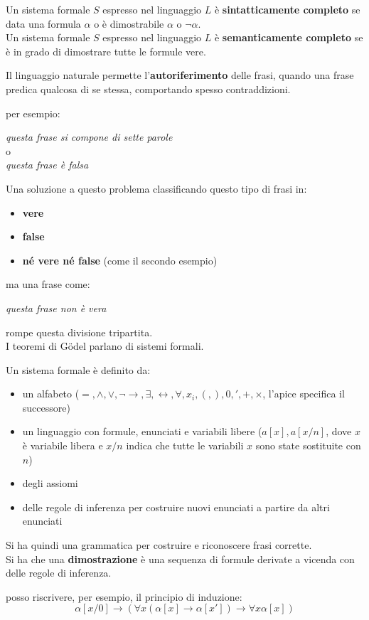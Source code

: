 \documentclass[a4paper,12pt, oneside]{book}
\begin{document}
\begin{definizione}
  Un sistema formale $S$ espresso nel linguaggio $L$ è \textbf{sintatticamente
    completo} se data una formula $\alpha$ o è dimostrabile $\alpha$ o
  $\neg\alpha$.\\
  Un sistema formale $S$ espresso nel linguaggio $L$ è \textbf{semanticamente
    completo} se è in grado di dimostrare tutte le formule vere.
\end{definizione}
Il linguaggio naturale permette l'\textbf{autoriferimento} delle frasi, quando
una frase predica qualcosa di se stessa, comportando spesso contraddizioni.
\begin{esempio}
  per esempio:
  \begin{center}
    \textit{questa frase si compone di sette parole}
    \\o\\
    \textit{questa frase è falsa}
  \end{center}
\end{esempio}
Una soluzione a questo problema classificando questo tipo di frasi in:
\begin{itemize}
  \item \textbf{vere}
  \item \textbf{false}
  \item \textbf{né vere né false} (come il secondo esempio)
\end{itemize}
ma una frase come:
\begin{center}
  \textit{questa frase non è vera}
\end{center}
rompe questa divisione tripartita. \\
I teoremi di G\"{o}del parlano di sistemi formali.
\begin{definizione}
  Un sistema formale è definito da:
  \begin{itemize}
    \item un alfabeto ($=,\land,\lor, \neg \to, \exists, \leftrightarrow,
    \forall, x_i, (,),0,',+,\times$, l'apice specifica il successore)
    \item un linguaggio con formule, enunciati e variabili libere ($a[x],
    a[x/n]$, dove $x$ è variabile libera e $x/n$ indica che tutte le variabili
    $x$ sono state sostituite con $n$) 
    \item degli assiomi
    \item delle regole di inferenza per costruire nuovi enunciati a partire da
    altri enunciati
  \end{itemize}
  Si ha quindi una grammatica per costruire e riconoscere frasi corrette.\\
  Si ha che una \textbf{dimostrazione} è una sequenza di formule derivate a
  vicenda con delle regole di inferenza.
  \begin{esempio}
    posso riscrivere, per esempio, il principio di induzione:
    \[\alpha[x/0]\to(\forall x(\alpha[x]\to \alpha[x'])\to \forall x\alpha[x])\]
  \end{esempio}  
\end{definizione}
\end{document}
